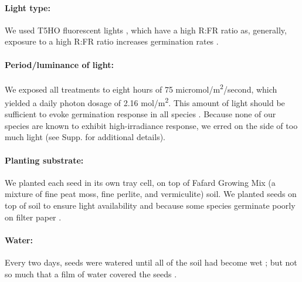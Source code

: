 \documentclass[12pt]{article}\usepackage[]{graphicx}\usepackage[]{color}
\begin{document}
	\paragraph{Light type:} We used T5HO fluorescent lights \parencite{Toole1963}, which have a high R:FR ratio as, generally, exposure to a high R:FR ratio increases germination rates \parencite[though some studies find germination requires high R:FR ratio or is insensitive,][]{Popay1970,Pons2000,Wulff1994}. %
	
	\paragraph{Period/luminance of light:} We exposed all treatments to eight hours \parencite[coinciding with the higher temperature,][]{Baskin1998} of 75 micromol/m\textsuperscript{2}/second, which yielded a daily photon dosage of 2.16 mol/m\textsuperscript{2}. This amount of light should be sufficient to evoke germination response in all species \parencite{Pons1991}. Because none of our species are known to exhibit high-irradiance response, we erred on the side of too much light (see Supp. for additional details).
	
	\paragraph{Planting substrate:} We planted each seed in its own tray cell, on top of Fafard Growing Mix (a mixture of fine peat moss, fine perlite, and vermiculite) soil. We planted seeds on top of soil to ensure light availability \parencite{Tester1987} and because some species germinate poorly on filter paper \parencite{Andrews1974}.
	
	\paragraph{Water:} Every two days, seeds were watered until all of the soil had become wet \parencite{Steinbauer1957}; but not so much that a film of water covered the seeds \parencite{AOSA1960}.
	
\end{document}
